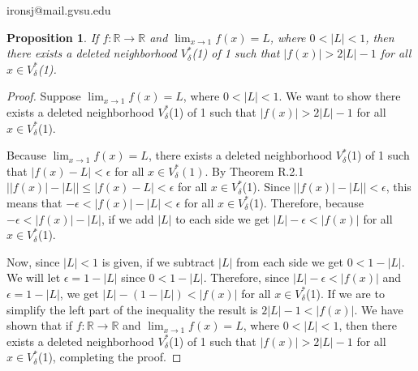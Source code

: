 \documentclass[11 pt]{article}
\newtheorem{proposition}{Proposition}
\newcommand{\newpar}{\vspace{.15in}\noindent}
\begin{document}
\noindent ironsj@mail.gvsu.edu
\newpar
\begin{proposition}
If $f:\mathbb{R}\rightarrow\mathbb{R}$ and $\displaystyle{\lim_{x \to 1}}f(x)=L$, where $0<\lvert L\rvert<1$, then there exists a deleted
neighborhood $V_\delta^*$(1) of 1 such that $\lvert f(x)\rvert>2\lvert L\rvert-1$ for all $x\in V_\delta^*$(1).
\end{proposition}
\begin{proof}
Suppose $\displaystyle{\lim_{x \to 1}}f(x)=L$, where $0<\lvert L\rvert<1$. We want to show there exists a deleted
neighborhood $V_\delta^*$(1) of 1 such that $\lvert f(x)\rvert>2\lvert L\rvert-1$ for all $x\in V_\delta^*$(1). 

\newpar
Because $\displaystyle{\lim_{x \to 1}}f(x)=L$, there exists a deleted neighborhood $V_\delta^*$(1) of 1 such that $\lvert f(x)-L\rvert<\epsilon$ for all $x\in V_\delta^*(1)$. By Theorem R.2.1 $\lvert\lvert f(x)\rvert-\lvert L\rvert\rvert\le\lvert f(x)-L\rvert<\epsilon$ for all $x\in V_\delta^*$(1). Since $\lvert\lvert f(x)\rvert-\lvert L\rvert\rvert<\epsilon$, this means that $-\epsilon<\lvert f(x)\rvert-\lvert L\rvert<\epsilon$ for all $x\in V_\delta^*$(1). Therefore, because $-\epsilon<\lvert f(x)\rvert-\lvert L\rvert$, if we add $\lvert L\rvert$ to each side we get $\lvert L\rvert-\epsilon<\lvert f(x)\rvert$ for all $x\in V_\delta^*$(1).

\newpar
 Now, since $\lvert L\rvert<1$ is given, if we subtract $\lvert L\rvert$ from each side we get $0<1-\lvert L\rvert$. We will let $\epsilon=1-\lvert L\rvert$ since $0<1-\lvert L\rvert$. Therefore, since $\lvert L\rvert-\epsilon<\lvert f(x)\rvert$ and $\epsilon=1-\lvert L\rvert$, we get $\lvert L\rvert-(1-\lvert L\rvert)<\lvert f(x)\rvert$ for all $x\in V_\delta^*$(1). If we are to simplify the left part of the inequality the result is $2\lvert L\rvert-1<\lvert f(x)\rvert$. We have shown that if $f:\mathbb{R}\rightarrow\mathbb{R}$ and $\displaystyle{\lim_{x \to 1}}f(x)=L$, where $0<\lvert L\rvert<1$, then there exists a deleted
neighborhood $V_\delta^*$(1) of 1 such that $\lvert f(x)\rvert>2\lvert L\rvert-1$ for all $x\in V_\delta^*$(1), completing the proof.

\end{proof}
\end{document}
